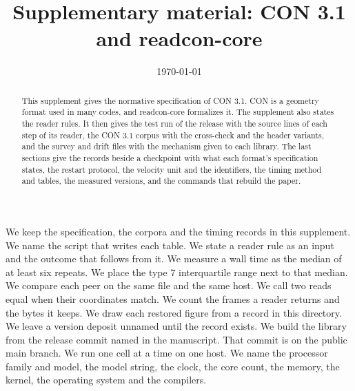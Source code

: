 \documentclass[preprint,12pt]{elsarticle}
\date{\today}
\title{Supplementary material: CON 3.1 and readcon-core}
\begin{document}

\begin{frontmatter}  \begin{abstract} This supplement gives the normative specification of CON 3.1.
CON is a geometry format used in many codes, and readcon-core formalizes it.
The supplement also states the reader rules.
It then gives the test run of the release with the source lines of each step of its reader, the CON 3.1 corpus with the cross-check and the header variants, and the survey and drift files with the mechanism given to each library.
The last sections give the records beside a checkpoint with what each format's specification states, the restart protocol, the velocity unit and the identifiers, the timing method and tables, the measured versions, and the commands that rebuild the paper.
\end{abstract} \end{frontmatter}

We keep the specification, the corpora and the timing records in this supplement.
We name the script that writes each table.
We state a reader rule as an input and the outcome that follows from it.
We measure a wall time as the median of at least six repeats.
We place the type 7 interquartile range next to that median.
We compare each peer on the same file and the same host.
We call two reads equal when their coordinates match.
We count the frames a reader returns and the bytes it keeps.
We draw each restored figure from a record in this directory.
We leave a version deposit unnamed until the record exists.
We build the library from the release commit named in the manuscript.
That commit is on the public main branch.
We run one cell at a time on one host.
We name the processor family and model, the model string, the clock, the core count, the memory, the kernel, the operating system and the compilers.
\end{document}
